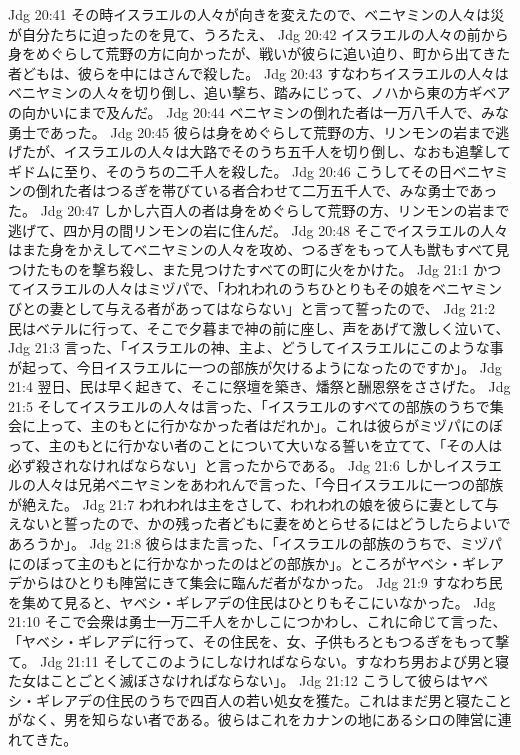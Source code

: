Jdg 20:41  その時イスラエルの人々が向きを変えたので、ベニヤミンの人々は災が自分たちに迫ったのを見て、うろたえ、
Jdg 20:42  イスラエルの人々の前から身をめぐらして荒野の方に向かったが、戦いが彼らに追い迫り、町から出てきた者どもは、彼らを中にはさんで殺した。
Jdg 20:43  すなわちイスラエルの人々はベニヤミンの人々を切り倒し、追い撃ち、踏みにじって、ノハから東の方ギベアの向かいにまで及んだ。
Jdg 20:44  ベニヤミンの倒れた者は一万八千人で、みな勇士であった。
Jdg 20:45  彼らは身をめぐらして荒野の方、リンモンの岩まで逃げたが、イスラエルの人々は大路でそのうち五千人を切り倒し、なおも追撃してギドムに至り、そのうちの二千人を殺した。
Jdg 20:46  こうしてその日ベニヤミンの倒れた者はつるぎを帯びている者合わせて二万五千人で、みな勇士であった。
Jdg 20:47  しかし六百人の者は身をめぐらして荒野の方、リンモンの岩まで逃げて、四か月の間リンモンの岩に住んだ。
Jdg 20:48  そこでイスラエルの人々はまた身をかえしてベニヤミンの人々を攻め、つるぎをもって人も獣もすべて見つけたものを撃ち殺し、また見つけたすべての町に火をかけた。
Jdg 21:1  かつてイスラエルの人々はミヅパで、「われわれのうちひとりもその娘をベニヤミンびとの妻として与える者があってはならない」と言って誓ったので、
Jdg 21:2  民はベテルに行って、そこで夕暮まで神の前に座し、声をあげて激しく泣いて、
Jdg 21:3  言った、「イスラエルの神、主よ、どうしてイスラエルにこのような事が起って、今日イスラエルに一つの部族が欠けるようになったのですか」。
Jdg 21:4  翌日、民は早く起きて、そこに祭壇を築き、燔祭と酬恩祭をささげた。
Jdg 21:5  そしてイスラエルの人々は言った、「イスラエルのすべての部族のうちで集会に上って、主のもとに行かなかった者はだれか」。これは彼らがミヅパにのぼって、主のもとに行かない者のことについて大いなる誓いを立てて、「その人は必ず殺されなければならない」と言ったからである。
Jdg 21:6  しかしイスラエルの人々は兄弟ベニヤミンをあわれんで言った、「今日イスラエルに一つの部族が絶えた。
Jdg 21:7  われわれは主をさして、われわれの娘を彼らに妻として与えないと誓ったので、かの残った者どもに妻をめとらせるにはどうしたらよいであろうか」。
Jdg 21:8  彼らはまた言った、「イスラエルの部族のうちで、ミヅパにのぼって主のもとに行かなかったのはどの部族か」。ところがヤベシ・ギレアデからはひとりも陣営にきて集会に臨んだ者がなかった。
Jdg 21:9  すなわち民を集めて見ると、ヤベシ・ギレアデの住民はひとりもそこにいなかった。
Jdg 21:10  そこで会衆は勇士一万二千人をかしこにつかわし、これに命じて言った、「ヤベシ・ギレアデに行って、その住民を、女、子供もろともつるぎをもって撃て。
Jdg 21:11  そしてこのようにしなければならない。すなわち男および男と寝た女はことごとく滅ぼさなければならない」。
Jdg 21:12  こうして彼らはヤベシ・ギレアデの住民のうちで四百人の若い処女を獲た。これはまだ男と寝たことがなく、男を知らない者である。彼らはこれをカナンの地にあるシロの陣営に連れてきた。
